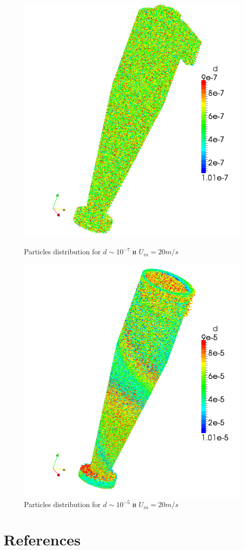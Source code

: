\documentclass[a4paper]{jpconf}
\begin{document}
	\newpage
\begin{figure}[h]
	\begin{minipage}{0.475\linewidth}
		\includegraphics[scale=0.4]{parcelsCyclone1}
		\caption{Particles distribution for $d \sim 10^{-7}$ и $U_{in} = 20m/s$}
		\label{fig:parcelsCyclone1}
	\end{minipage}
	\hspace{0.5em}
	\begin{minipage}{0.475\linewidth}
		\includegraphics[scale=0.4]{parcelsCyclone3}
		\caption{Particles distribution for $d \sim 10^{-5}$ и $U_{in} = 20m/s$}
		\label{fig:parcelsCyclone3}
	\end{minipage}
\end{figure}	
\section*{References}

\end{document}
